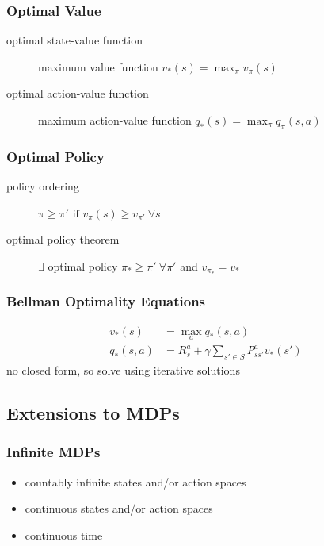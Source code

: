 \documentclass[]{article}
\theoremstyle{definition}
\begin{document}
\subsubsection{Optimal Value}
\label{ssub:optimal_value_function}
\begin{description}
    \item[optimal state-value function] maximum value function $v_*(s) = \max_\pi v_\pi(s)$
    \item[optimal action-value function] maximum action-value function $q_*(s) = \max_\pi q_\pi(s,a)$
\end{description}

\subsubsection{Optimal Policy}
\label{ssub:optimal_policy}
\begin{description}
    \item[policy ordering] $\pi \geq \pi' \text{ if } v_\pi(s) \geq v_{\pi'} \ \forall s$
    \item[optimal policy theorem] $\exists $ optimal policy $\pi_* \geq \pi' \ \forall \pi'$ and $v_{\pi_*} = v_*$
\end{description}

\subsubsection{Bellman Optimality Equations}
\label{ssub:bellman_optimality_equations}

\begin{align*}
    v_*(s) &= \max_a q_*(s,a) \\
    q_*(s, a) &= R_s^a + \gamma \sum_{s' \in S} P^a_{ss'} v_*(s')
\end{align*}
no closed form, so solve using iterative solutions

\subsection{Extensions to MDPs}
\label{sub:extensions_to_mdps}

\subsubsection{Infinite MDPs}
\label{ssub:infinite_mdps}
\begin{itemize}
    \item countably infinite states and/or action spaces
    \item continuous states and/or action spaces
    \item continuous time
\end{itemize}
\end{document}
